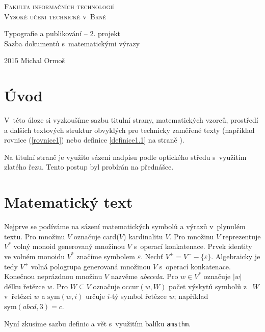 \documentclass[a4paper, 11pt]{article}
\theoremstyle{definition} %
\begin{document}
\onecolumn
\pagestyle{empty}
\begin{center}
\huge
\textsc{Fakulta informačních technologií
\\Vysoké učení technické v~Brně}

\LARGE
Typografie a publikování -- 2. projekt
\\Sazba dokumentů s~matematickými výrazy
\end{center}

{\LARGE 2015 \hfill Michal Ormoš}


\newpage
\pagestyle{plain}
\setcounter{page}{1}

\twocolumn

\section*{Úvod}
V~této úloze si vyzkoušíme sazbu titulní strany, matematických vzorců, prostředí a dalších textových struktur obvyklých pro technicky zaměřené texty (například rovnice (\ref{rovnice1}) nebo definice \ref{definice1.1} na straně \pageref{definice1.1}).

Na titulní straně je využito sázení nadpisu podle optického středu s~využitím zlatého řezu. Tento postup byl probírán na přednášce.


\section{Matematický text}
Nejprve se podíváme na sázení matematických symbolů a výrazů v~plynulém textu. Pro množinu $V$ označuje card($V$) kardinalitu $V$.
Pro množinu $V$ reprezentuje $V^{*}$ volný monoid generovaný množinou $V$ s~operací konkatenace.
Prvek identity ve volném monoidu $V^{*}$ značíme symbolem $\varepsilon$.
Nechť $V^{+} = V^{-} - \{\varepsilon\}$. Algebraicky je tedy $V^{+}$ volná pologrupa generovaná množinou $V$ s~operací konkatenace.
Konečnou neprázdnou množinu $V$ nazvěme \textit{abeceda}.
Pro $w \in V^*$ označuje $|w|$ délku řetězce  $w$. Pro $W \subseteq V$ označuje $\mbox{occur}(w,W)$ počet výskytů symbolů z ~$W$ v~řetězci $w$ a $\mbox{sym}({w,i})$ určuje $i$-tý symbol řetězce $w$; například $\mbox{sym}(abcd,3)=c$.

Nyní zkusíme sazbu definic a vět s~využitím balíku \texttt{amsthm}.
\end{document}
